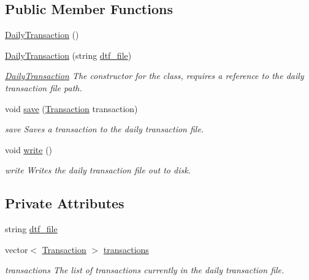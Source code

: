 \subsection*{Public Member Functions}
\begin{DoxyCompactItemize}
\item 
\hyperlink{class_daily_transaction_a5e0774feeed7c301fdf41c8355a7379d}{Daily\-Transaction} ()
\item 
\hyperlink{class_daily_transaction_a6d37b085e35dffdc5821b591e2e989fa}{Daily\-Transaction} (string \hyperlink{class_daily_transaction_ae77e11b6ea857b9155c8b74d285a7323}{dtf\-\_\-file})
\begin{DoxyCompactList}\small\item\em \hyperlink{class_daily_transaction}{Daily\-Transaction} The constructor for the class, requires a reference to the daily transaction file path. \end{DoxyCompactList}\item 
void \hyperlink{class_daily_transaction_ad618edc2ee7ccd8a63240f64b91918c6}{save} (\hyperlink{class_transaction}{Transaction} transaction)
\begin{DoxyCompactList}\small\item\em save Saves a transaction to the daily transaction file. \end{DoxyCompactList}\item 
void \hyperlink{class_daily_transaction_aac759501cf6c7895a70eecbef0226ae1}{write} ()
\begin{DoxyCompactList}\small\item\em write Writes the daily transaction file out to disk. \end{DoxyCompactList}\end{DoxyCompactItemize}
\subsection*{Private Attributes}
\begin{DoxyCompactItemize}
\item 
string \hyperlink{class_daily_transaction_ae77e11b6ea857b9155c8b74d285a7323}{dtf\-\_\-file}
\item 
vector$<$ \hyperlink{class_transaction}{Transaction} $>$ \hyperlink{class_daily_transaction_ad8a3abd39eadee0df36b0211044a9f6d}{transactions}
\begin{DoxyCompactList}\small\item\em transactions The list of transactions currently in the daily transaction file. \end{DoxyCompactList}\end{DoxyCompactItemize}


